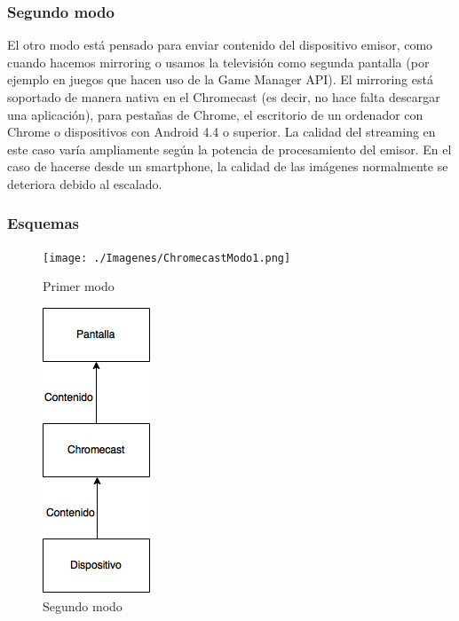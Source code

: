 \subsubsection{Segundo modo}
El otro modo está pensado para enviar contenido del dispositivo emisor, como cuando hacemos mirroring o usamos la televisión como segunda pantalla (por ejemplo en juegos que hacen uso de la Game Manager API).
El mirroring está soportado de manera nativa en el Chromecast (es decir, no hace falta descargar una aplicación), para pestañas de Chrome, el escritorio de un ordenador con Chrome o dispositivos con Android 4.4 o superior.
La calidad del streaming en este caso varía ampliamente según la potencia de procesamiento del emisor.
En el caso de hacerse desde un smartphone, la calidad de las imágenes normalmente se deteriora debido al escalado.

\subsubsection{Esquemas}

\begin{figure}[h]
	\centering
	\begin{minipage}[b]{.35\textwidth}
		\centering
		\texttt{[image: ./Imagenes/ChromecastModo1.png]}
		\caption{Primer modo}\label{fig:modo1}
	\end{minipage}\qquad
	\hspace{1.5cm}
	\begin{minipage}[b]{.35\textwidth}
		\centering
		\includegraphics[scale=0.6]{./Imagenes/ChromecastModo2.png}
		\caption{Segundo modo}\label{fig:modo2}
	\end{minipage}
\end{figure}


